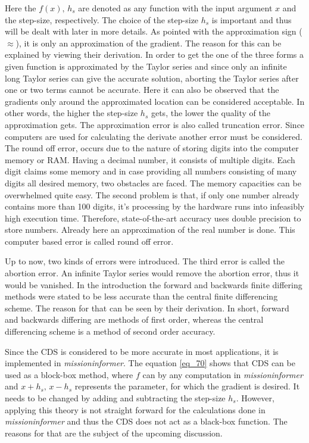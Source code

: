 Here the $f(x),\, h_s$ are denoted as any function with 
the input argument $x$ and the step-size, respectively. 
The choice of the step-size $h_s$ is important 
and thus will be dealt with later in more details.  
As pointed with the approximation sign ($\approx$), 
it is only an approximation of the gradient. The reason for 
this can be explained by viewing 
their derivation. In order to get the one of the 
three forms a given function is approximated by 
the Taylor series and since only an infinite 
long Taylor series can give the accurate solution, 
aborting the Taylor series after one or 
two terms cannot be accurate. Here it can also 
be observed that the gradients only around 
the approximated location can be considered 
acceptable. In other words, the higher the step-size 
$h_s$ gets, the lower the 
quality of the approximation gets. The 
approximation error is also called 
truncation error. Since computers are used 
for calculating the derivate another 
error must be considered. The round off error, 
occurs due to the nature of storing 
digits into the computer memory or RAM.
Having a decimal number, it 
consists of multiple digits. Each digit 
claims some memory and in case providing 
all numbers consisting of many digits
all desired memory, two obstacles 
are faced. The memory capacities can be 
overwhelmed quite easy. The second problem is that, 
if only one number already contains more than 100 
digits, it's processing by the
hardware runs into  
infeasibly high execution time. Therefore, 
state-of-the-art accuracy uses double 
precision to store numbers. Already here 
an approximation of the real number is done.
This computer based error is called 
round off error.\newline 

Up to now, two kinds of errors were introduced.  
The third error is called the abortion error. 
An infinite Taylor series would 
remove the abortion 
error, thus it would be vanished. In the introduction 
the forward and backwards finite differing methods 
were stated to be less accurate than the central 
finite differencing scheme. The reason for that can 
be seen by their derivation. In short, 
forward and backwards differing are methods of first order,
 whereas 
the central differencing scheme is a method of 
second order accuracy.\newline

Since the CDS is considered to be more 
accurate in most applications, it is implemented 
in \emph{missioninformer}. The equation \eqref{eq_70} 
shows that CDS can be used as a block-box method, 
where $f$ can by any computation in \emph{missioninformer} 
and $x+h_s,\, x- h_s$ represents the parameter, for which 
the gradient is desired. It needs to be changed 
by adding and subtracting the step-size $h_s$.
However, applying this theory is not straight forward 
for the calculations done in \emph{missioninformer} and 
thus the CDS does not act as a black-box function.
The reasons for that are the subject of the 
upcoming discussion.\newline 

